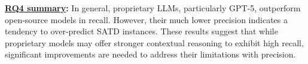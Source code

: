 
\begin{tcolorbox}
\noindent\textbf{\underline{RQ4 summary}:}
In general, proprietary LLMs, particularly GPT-5, outperform open-source models in recall. However, their much lower precision indicates a tendency to over-predict SATD instances. These results suggest that while proprietary models may offer stronger contextual reasoning to exhibit high recall, significant improvements are needed to address their limitations with precision.
\end{tcolorbox}
